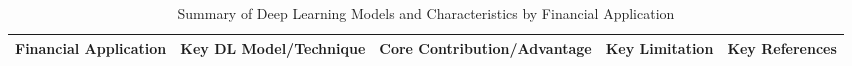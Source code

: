 \begin{table}[htbp] %
\centering
\caption{Summary of Deep Learning Models and Characteristics by Financial Application}
\label{tab:application_summary}
\small %

\begin{tabularx}{\textwidth}{>{\RaggedRight}X >{\RaggedRight}X >{\RaggedRight}X >{\RaggedRight}X >{\RaggedRight\arraybackslash}X}
\toprule
\textbf{Financial Application} & \textbf{Key DL Model/Technique} & \textbf{Core Contribution/Advantage} & \textbf{Key Limitation} & \textbf{Key References} \\
\midrule
\endhead %



\end{tabularx}
\end{table}

